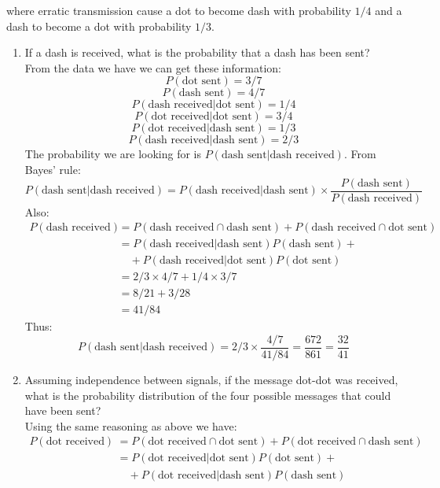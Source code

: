 \documentclass[a4paper]{article}
\begin{document}
\begin{enumerate}
  where erratic transmission cause a dot to become dash with probability $1/4$
  and a dash to become a dot with probability $1/3$.
    \begin{enumerate}
      \item If a dash is received, what is the probability that a dash has been
      sent?\\
      From the data we have we can get these information:
      $$P(\text{dot sent})=3/7$$
      $$P(\text{dash sent})=4/7$$
      $$P(\text{dash received}|\text{dot sent})=1/4$$
      $$P(\text{dot received}|\text{dot sent})=3/4$$
      $$P(\text{dot received}|\text{dash sent})=1/3$$
      $$P(\text{dash received}|\text{dash sent})=2/3$$
      The probability we are looking for is $P(\text{dash sent}|\text{dash
      received})$. From Bayes' rule:
      $$P(\text{dash sent}|\text{dash received})=P(\text{dash
      received}|\text{dash sent})\times\frac{P(\text{dash
      sent})}{P(\text{dash received})}$$
      Also:
      \begin{align}
      P(\text{dash received})&=P(\text{dash received}\cap\text{dash
      sent})+P(\text{dash received}\cap\text{dot sent})\nonumber\\
      &=P(\text{dash received}|\text{dash sent})P(\text{dash sent})+\nonumber\\
      &\quad+P(\text{dash received}|\text{dot sent})P(\text{dot sent})\nonumber\\
      &=2/3\times4/7+1/4\times3/7\nonumber\\
      &=8/21+3/28\nonumber\\
      &=41/84
      \end{align}
      Thus:
      $$P(\text{dash sent}|\text{dash
      received})=2/3\times\frac{4/7}{41/84}=\frac{672}{861}=\frac{32}{41}$$
      \item Assuming independence between signals, if the message dot-dot was
      received, what is the probability distribution of the four possible
      messages that could have been sent?\\
      Using the same reasoning as above we have:
      \begin{align}
      P(\text{dot received})&=P(\text{dot received}\cap\text{dot
      sent})+P(\text{dot received}\cap\text{dash sent})\nonumber\\
      &=P(\text{dot received}|\text{dot sent})P(\text{dot sent})+\nonumber\\
      &\quad+P(\text{dot received}|\text{dash sent})P(\text{dash
      sent})\nonumber\\

\end{align}
\end{enumerate}
\end{enumerate}
\end{document}
